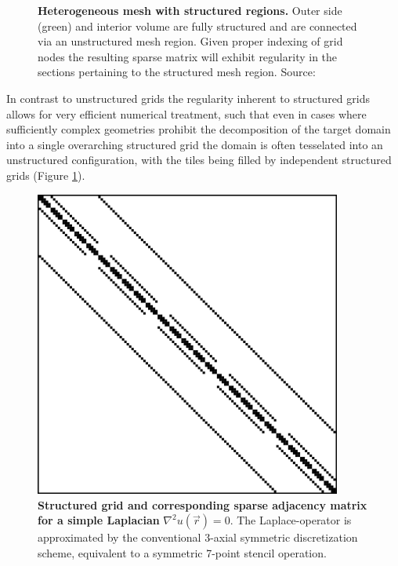 \documentclass{article}
\begin{document}
\begin{figure}[ht]
\begin{minipage}{0.5\textwidth}
          \caption{\textbf{Heterogeneous mesh with structured regions.} Outer side (green) and interior volume are fully structured and are connected via an unstructured mesh region. Given proper indexing of grid nodes the resulting sparse matrix will exhibit regularity in the sections pertaining to the structured mesh region. Source: \cite{cubit-mesh-refinement:website}}
          \label{fig:refined_structured_grid}
        \end{minipage}
    \end{figure}

    In contrast to unstructured grids the regularity inherent to structured grids allows for very efficient numerical treatment, such that even in cases where sufficiently complex geometries prohibit the decomposition of the target domain into a single overarching structured grid the domain is often tesselated into an unstructured configuration, with the tiles being filled by independent structured grids \cite{Badcock2000}(Figure \ref{fig:refined_structured_grid}).

    \begin{figure}
        \centering
        \begin{minipage}{0.45\textwidth}
          \centering
          
        \end{minipage}\hfill
        \begin{minipage}{0.45\textwidth}
            \centering
            \includegraphics[width=0.9\textwidth]{fig/laplacian_example.png} %
        \end{minipage}
        \caption{\textbf{Structured grid and corresponding sparse adjacency matrix for a simple Laplacian} $\nabla^2 u(\vec{r}) = 0$. The Laplace-operator is approximated by the conventional 3-axial symmetric discretization scheme, equivalent to a symmetric 7-point stencil operation.}
        \label{fig:laplacian_example}
    \end{figure}
\end{document}
